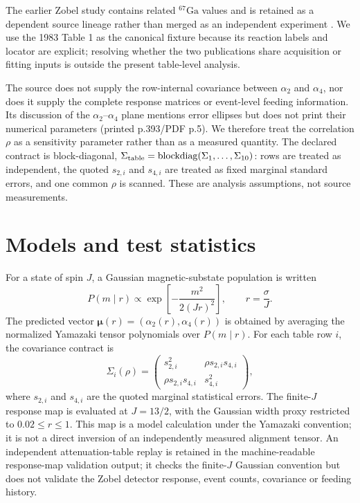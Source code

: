 \documentclass[pdflatex,iicol,sn-mathphys-num]{sn-jnl}
\begin{document}
The earlier Zobel study contains related \(^{67}\mathrm{Ga}\) values and is retained
as a dependent source lineage rather than merged as an independent experiment
\cite{Zobel1980}. We use the 1983 Table 1 as the canonical fixture because its
reaction labels and locator are explicit; resolving whether the two publications
share acquisition or fitting inputs is outside the present table-level analysis.

The source does not supply the row-internal covariance between \(\alpha_2\) and \(\alpha_4\), nor does it supply the complete response matrices or event-level feeding information. Its discussion of the \(\alpha_2\)--\(\alpha_4\) plane mentions error ellipses but does not print their numerical parameters (printed p.393/PDF p.5). We therefore treat the correlation \(\rho\) as a sensitivity parameter rather than as a measured quantity. The declared contract is block-diagonal,
\(\Sigma_{\rm table}=\operatorname{blockdiag}(\Sigma_1,\ldots,\Sigma_{10})\):
rows are treated as independent, the quoted \(s_{2,i}\) and \(s_{4,i}\) are treated
as fixed marginal standard errors, and one common \(\rho\) is scanned. These are
analysis assumptions, not source measurements.

\section{Models and test statistics}

For a state of spin \(J\), a Gaussian magnetic-substate population is written
\begin{equation}
P(m\mid r)\propto \exp\left[-\frac{m^2}{2(Jr)^2}\right],\qquad r=\frac{\sigma}{J}.
\end{equation}
The predicted vector
\(\boldsymbol{\mu}(r)=(\alpha_2(r),\alpha_4(r))\) is obtained by averaging the normalized Yamazaki tensor polynomials over \(P(m\mid r)\). For each table row \(i\), the covariance contract is
\begin{equation}
\Sigma_i(\rho)=
\begin{pmatrix}
s_{2,i}^2 & \rho s_{2,i}s_{4,i}\\
\rho s_{2,i}s_{4,i} & s_{4,i}^2
\end{pmatrix},
\end{equation}
where \(s_{2,i}\) and \(s_{4,i}\) are the quoted marginal statistical errors.
The finite-\(J\) response map is evaluated at \(J=13/2\), with the Gaussian width
proxy restricted to \(0.02\leq r\leq1\). This map is a model calculation under the
Yamazaki convention; it is not a direct inversion of an independently measured
alignment tensor. An independent attenuation-table replay is retained in the
machine-readable response-map validation output; it checks the finite-\(J\)
Gaussian convention but does not validate the Zobel detector response, event
counts, covariance or feeding history.
\end{document}
